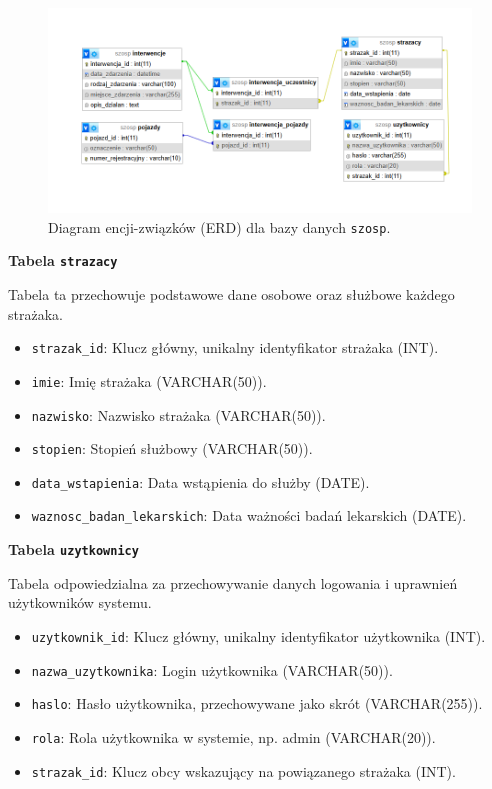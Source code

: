 \begin{figure}[H]
	\centering
	\includegraphics[width=\textwidth]{figures/BazaDanych.png}
	\caption{Diagram encji-związków (ERD) dla bazy danych \texttt{szosp}.}
	\label{fig:erd}
\end{figure}

\textbf{Tabela \texttt{strazacy}}

Tabela ta przechowuje podstawowe dane osobowe oraz służbowe każdego strażaka.

\begin{itemize}
    \item \texttt{strazak\_id}: Klucz główny, unikalny identyfikator strażaka (INT).
    \item \texttt{imie}: Imię strażaka (VARCHAR(50)).
    \item \texttt{nazwisko}: Nazwisko strażaka (VARCHAR(50)).
    \item \texttt{stopien}: Stopień służbowy (VARCHAR(50)).
    \item \texttt{data\_wstapienia}: Data wstąpienia do służby (DATE).
    \item \texttt{waznosc\_badan\_lekarskich}: Data ważności badań lekarskich (DATE).
\end{itemize}

\textbf{Tabela \texttt{uzytkownicy}}


Tabela odpowiedzialna za przechowywanie danych logowania i uprawnień użytkowników systemu.
\begin{itemize}
    \item \texttt{uzytkownik\_id}: Klucz główny, unikalny identyfikator użytkownika (INT).
    \item \texttt{nazwa\_uzytkownika}: Login użytkownika (VARCHAR(50)).
    \item \texttt{haslo}: Hasło użytkownika, przechowywane jako skrót (VARCHAR(255)).
    \item \texttt{rola}: Rola użytkownika w systemie, np. admin (VARCHAR(20)).
    \item \texttt{strazak\_id}: Klucz obcy wskazujący na powiązanego strażaka (INT).
\end{itemize}

